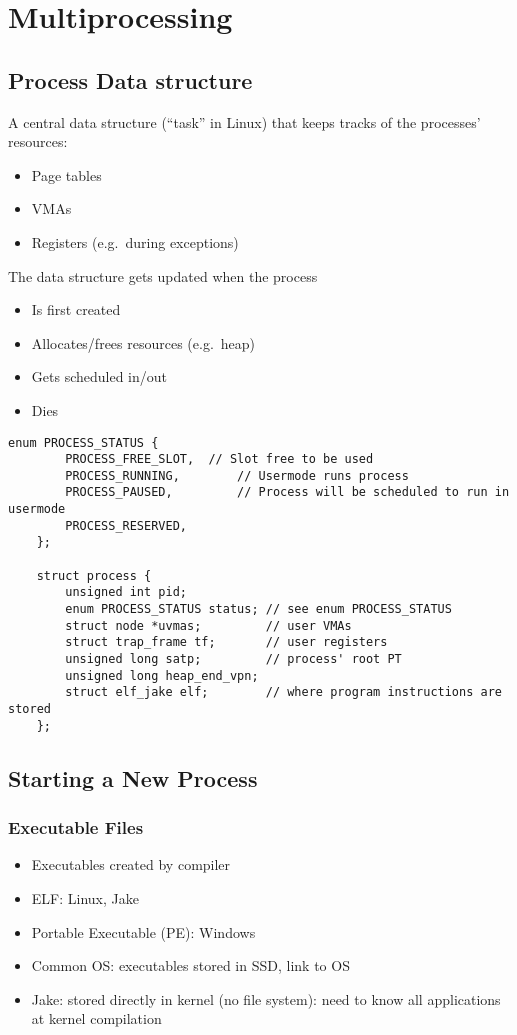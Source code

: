 \section{Multiprocessing}
\subsection{Process Data structure}
A central data structure (``task'' in Linux) that keeps tracks of the processes' resources:
\begin{itemize}
    \item Page tables
    \item VMAs
    \item Registers (e.g.\ during exceptions)
\end{itemize}
The data structure gets updated when the process
\begin{itemize}
    \item Is first created
    \item Allocates/frees resources (e.g.\ heap)
    \item Gets scheduled in/out
    \item Dies
\end{itemize}

\begin{lstlisting}[style=bright_C++]
    enum PROCESS_STATUS {
        PROCESS_FREE_SLOT, 	// Slot free to be used
        PROCESS_RUNNING, 	    // Usermode runs process
        PROCESS_PAUSED, 	    // Process will be scheduled to run in usermode
        PROCESS_RESERVED,
    };

    struct process {
        unsigned int pid;
        enum PROCESS_STATUS status; // see enum PROCESS_STATUS
        struct node *uvmas;         // user VMAs
        struct trap_frame tf;       // user registers
        unsigned long satp;         // process' root PT
        unsigned long heap_end_vpn;
        struct elf_jake elf;        // where program instructions are stored
    };
\end{lstlisting}

\subsection{Starting a New Process}
\subsubsection{Executable Files}
\begin{itemize}
    \item Executables created by compiler
    \item ELF: Linux, Jake
    \item Portable Executable (PE): Windows
    \item Common OS: executables stored in SSD, link to OS
    \item Jake: stored directly in kernel (no file system): need to know all applications at kernel compilation
\end{itemize}

